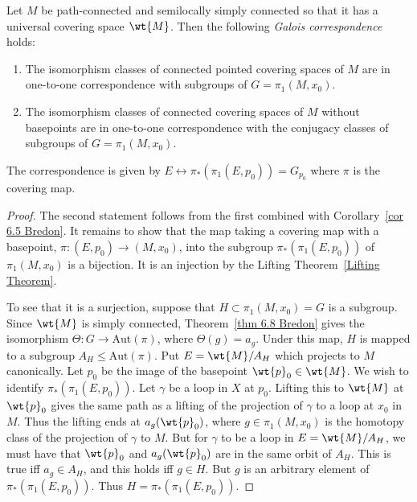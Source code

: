\begin{thm}
    Let $M$ be path-connected and semilocally simply connected so that it has a universal covering space $\wt{M}$. Then the following \emph{Galois correspondence} holds:
\begin{enumerate}
	\item The isomorphism classes of connected pointed covering spaces of $M$ are in one-to-one correspondence with subgroups of $G=\pi_1(M, x_0)$. 
	\item The isomorphism classes of connected covering spaces of $M$ without basepoints are in one-to-one correspondence with the conjugacy classes of subgroups of $G=\pi_1(M, x_0)$.
\end{enumerate}
The correspondence is given by $E\leftrightarrow \pi_\ast(\pi_1(E,p_0))=G_{p_0}$ where $\pi$ is the covering map.
\end{thm}
\begin{proof}
    The second statement follows from the first combined with Corollary~\ref{cor 6.5 Bredon}. It remains to show that the map taking a covering map with a basepoint, $\pi:(E,p_0)\to (M,x_0)$, into the subgroup $\pi_\ast(\pi_1(E,p_0))$ of $\pi_1(M,x_0)$ is a bijection. It is an injection by the Lifting Theorem~\ref{Lifting Theorem}. 
    
    To see that it is a surjection, suppose that $H\subset \pi_1(M,x_0)=G$ is a subgroup. Since $\wt{M}$ is simply connected, Theorem~\ref{thm 6.8 Bredon} gives the isomorphism $\Theta:G\to \mathrm{Aut}(\pi)$, where $\Theta(g)=a_g$. Under this map, $H$ is mapped to a subgroup $A_H\leq \mathrm{Aut}(\pi)$. Put $E=\wt{M}/A_H$ which projects to $M$ canonically. Let $p_0$ be the image of the basepoint $\wt{p}_0\in\wt{M}$. We wish to identify $\pi_\ast(\pi_1(E,p_0))$. Let $\gamma$ be a loop in $X$ at $p_0$. Lifting this to $\wt{M}$ at $\wt{p}_0$ gives the same path as a lifting of the projection of $\gamma$ to a loop at $x_0$ in $M$. Thus the lifting ends at $a_g(\wt{p}_0)$, where $g\in\pi_1(M,x_0)$ is the homotopy class of the projection of $\gamma$ to $M$. But for $\gamma$ to be a loop in $E=\wt{M}/A_H$, we must have that $\wt{p}_0$ and $a_g(\wt{p}_0)$ are in the same orbit of $A_H$. This is true iff $a_g\in A_H$, and this holds iff $g\in H$. But $g$ is an arbitrary element of $\pi_\ast(\pi_1(E,p_0))$. Thus $H=\pi_\ast(\pi_1(E,p_0))$.
\end{proof}


